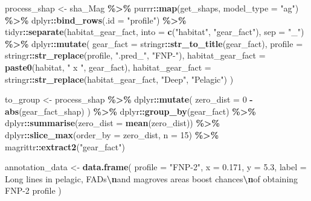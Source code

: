 \documentclass[
]{book}
\newenvironment{Shaded}{\begin{snugshade}}{\end{snugshade}}
\newcommand{\AttributeTok}[1]{\textcolor[rgb]{0.13,0.29,0.53}{#1}}
\newcommand{\DecValTok}[1]{\textcolor[rgb]{0.00,0.00,0.81}{#1}}
\newcommand{\FloatTok}[1]{\textcolor[rgb]{0.00,0.00,0.81}{#1}}
\newcommand{\FunctionTok}[1]{\textcolor[rgb]{0.13,0.29,0.53}{\textbf{#1}}}
\newcommand{\NormalTok}[1]{#1}
\newcommand{\OtherTok}[1]{\textcolor[rgb]{0.56,0.35,0.01}{#1}}
\newcommand{\SpecialCharTok}[1]{\textcolor[rgb]{0.81,0.36,0.00}{\textbf{#1}}}
\newcommand{\StringTok}[1]{\textcolor[rgb]{0.31,0.60,0.02}{#1}}
\begin{document}
\begin{Shaded}
\begin{Highlighting}[]
\NormalTok{process\_shap }\OtherTok{\textless{}{-}}
\NormalTok{  sha\_Mag }\SpecialCharTok{\%\textgreater{}\%}
\NormalTok{  purrr}\SpecialCharTok{::}\FunctionTok{map}\NormalTok{(get\_shaps, }\AttributeTok{model\_type =} \StringTok{"ag"}\NormalTok{) }\SpecialCharTok{\%\textgreater{}\%}
\NormalTok{  dplyr}\SpecialCharTok{::}\FunctionTok{bind\_rows}\NormalTok{(}\AttributeTok{.id =} \StringTok{"profile"}\NormalTok{) }\SpecialCharTok{\%\textgreater{}\%}
\NormalTok{  tidyr}\SpecialCharTok{::}\FunctionTok{separate}\NormalTok{(habitat\_gear\_fact, }\AttributeTok{into =} \FunctionTok{c}\NormalTok{(}\StringTok{"habitat"}\NormalTok{, }\StringTok{"gear\_fact"}\NormalTok{), }\AttributeTok{sep =} \StringTok{"\_"}\NormalTok{) }\SpecialCharTok{\%\textgreater{}\%}
\NormalTok{  dplyr}\SpecialCharTok{::}\FunctionTok{mutate}\NormalTok{(}
    \AttributeTok{gear\_fact =}\NormalTok{ stringr}\SpecialCharTok{::}\FunctionTok{str\_to\_title}\NormalTok{(gear\_fact),}
    \AttributeTok{profile =}\NormalTok{ stringr}\SpecialCharTok{::}\FunctionTok{str\_replace}\NormalTok{(profile, }\StringTok{".pred\_"}\NormalTok{, }\StringTok{"FNP{-}"}\NormalTok{),}
    \AttributeTok{habitat\_gear\_fact =} \FunctionTok{paste0}\NormalTok{(habitat, }\StringTok{" x "}\NormalTok{, gear\_fact),}
    \AttributeTok{habitat\_gear\_fact =}\NormalTok{ stringr}\SpecialCharTok{::}\FunctionTok{str\_replace}\NormalTok{(habitat\_gear\_fact, }\StringTok{"Deep"}\NormalTok{, }\StringTok{"Pelagic"}\NormalTok{)}
\NormalTok{  )}

\NormalTok{to\_group }\OtherTok{\textless{}{-}}
\NormalTok{  process\_shap }\SpecialCharTok{\%\textgreater{}\%}
\NormalTok{  dplyr}\SpecialCharTok{::}\FunctionTok{mutate}\NormalTok{(}
    \AttributeTok{zero\_dist =} \DecValTok{0} \SpecialCharTok{{-}} \FunctionTok{abs}\NormalTok{(gear\_fact\_shap)}
\NormalTok{  ) }\SpecialCharTok{\%\textgreater{}\%}
\NormalTok{  dplyr}\SpecialCharTok{::}\FunctionTok{group\_by}\NormalTok{(gear\_fact) }\SpecialCharTok{\%\textgreater{}\%}
\NormalTok{  dplyr}\SpecialCharTok{::}\FunctionTok{summarise}\NormalTok{(}\AttributeTok{zero\_dist =} \FunctionTok{mean}\NormalTok{(zero\_dist)) }\SpecialCharTok{\%\textgreater{}\%}
\NormalTok{  dplyr}\SpecialCharTok{::}\FunctionTok{slice\_max}\NormalTok{(}\AttributeTok{order\_by =}\NormalTok{ zero\_dist, }\AttributeTok{n =} \DecValTok{15}\NormalTok{) }\SpecialCharTok{\%\textgreater{}\%}
\NormalTok{  magrittr}\SpecialCharTok{::}\FunctionTok{extract2}\NormalTok{(}\StringTok{"gear\_fact"}\NormalTok{)}

\NormalTok{annotation\_data }\OtherTok{\textless{}{-}} \FunctionTok{data.frame}\NormalTok{(}
  \AttributeTok{profile =} \StringTok{"FNP{-}2"}\NormalTok{,}
  \AttributeTok{x =} \FloatTok{0.171}\NormalTok{,}
  \AttributeTok{y =} \FloatTok{5.3}\NormalTok{,}
  \AttributeTok{label =} \StringTok{\textquotesingle{}Long lines in pelagic, FADs}\SpecialCharTok{\textbackslash{}n}\StringTok{and magroves areas boost chances}\SpecialCharTok{\textbackslash{}n}\StringTok{of obtaining FNP{-}2 profile\textquotesingle{}}
\NormalTok{)}


\end{Highlighting}
\end{Shaded}
\end{document}
